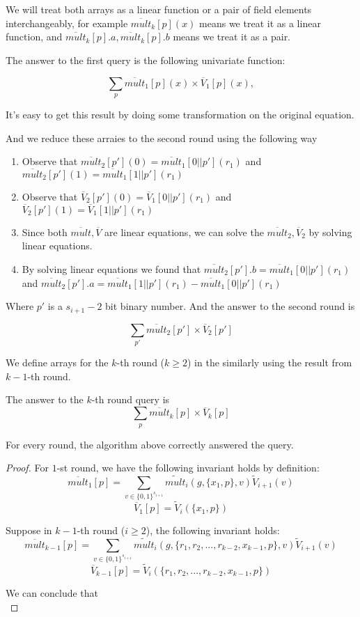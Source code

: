 We will treat both arrays as a linear function or a pair of field elements interchangeably, for example $\overline{mult}_k[p](x)$ means we treat it as a linear function, and $\overline{mult}_k[p].a, \overline{mult}_k[p].b$ means we treat it as a pair.

The answer to the first query is the following univariate function:

$$\sum_{p}\overline{mult}_1[p](x)\times\overline{V}_1[p](x),$$

It's easy to get this result by doing some transformation on the original equation.

And we reduce these arraies to the second round using the following way

\begin{enumerate}
	\item Observe that $\overline{mult}_2[p'](0)=\overline{mult}_1[0||p'](r_1)$ and $\overline{mult}_2[p'](1)=\overline{mult}_1[1||p'](r_1)$
	\item Observe that $\overline{V}_2[p'](0)=\overline{V}_1[0||p'](r_1)$ and $\overline{V}_2[p'](1)=\overline{V}_1[1||p'](r_1)$

	\item Since both $\overline{mult}, \overline{V}$ are linear equations, we can solve the $\overline{mult}_2, \overline{V}_2$ by solving linear equations.
	\item By solving linear equations we found that $\overline{mult}_2[p'].b=\overline{mult}_1[0||p'](r_1)$ and $\overline{mult}_2[p'].a=\overline{mult}_1[1||p'](r_1)-\overline{mult}_1[0||p'](r_1)$
\end{enumerate}

Where $p'$ is a $s_{i+1}-2$ bit binary number. And the answer to the second round is 

$$\sum_{p'}\overline{mult}_2[p']\times\overline{V}_2[p']$$

We define arrays for the $k$-th round ($k\ge 2$) in the similarly using the result from $k-1$-th round.

The answer to the $k$-th round query is 
$$\sum_{p}\overline{mult}_k[p]\times\overline{V}_k[p]$$

\begin{theorem} For every round, the algorithm above correctly answered the query.
\end{theorem}

\begin{proof}
For $1$-st round, we have the following invariant holds by definition:
$$\overline{mult}_1[p]{=}\sum_{v\in \{0,1\}^{s_{i+1}}}\tilde{mult}_i(g, \{x_1, p\}, v)\tilde{V}_{i+1}(v)$$
$$\overline{V}_1[p]{=}\tilde{V}_i(\{x_1, p\})$$

Suppose in $k-1$-th round ($i \ge 2$), the following invariant holds:
$$\overline{mult}_{k-1}[p]{=}\sum_{v\in \{0,1\}^{s_{i+1}}}\tilde{mult}_i(g, \{r_1,r_2,...,r_{k-2},x_{k-1}, p\}, v)\tilde{V}_{i+1}(v)$$
$$\overline{V}_{k-1}[p]{=}\tilde{V}_i(\{r_1, r_2,...,r_{k-2},x_{k-1}, p\})$$

We can conclude that $$$$

\end{proof}

